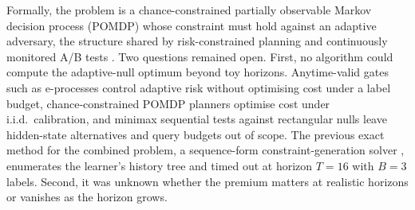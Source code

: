 \documentclass{article}
\theoremstyle{plain}
\theoremstyle{definition}
\theoremstyle{remark}
\begin{document}
Formally, the problem is a chance-constrained partially observable Markov decision process (POMDP) whose constraint must hold against an adaptive adversary, the structure shared by risk-constrained planning \citep{ono2015chance} and continuously monitored A/B tests \citep{johari2022always}. Two questions remained open. First, no algorithm could compute the adaptive-null optimum beyond toy horizons. Anytime-valid gates such as e-processes control adaptive risk without optimising cost under a label budget, chance-constrained POMDP planners optimise cost under i.i.d.\ calibration, and minimax sequential tests against rectangular nulls \citep{fauss2020minimax} leave hidden-state alternatives and query budgets out of scope. The previous exact method for the combined problem, a sequence-form constraint-generation solver \citep{bosansky2014exact}, enumerates the learner's history tree and timed out at horizon $T=16$ with $B=3$ labels. Second, it was unknown whether the premium matters at realistic horizons or vanishes as the horizon grows.
\end{document}
